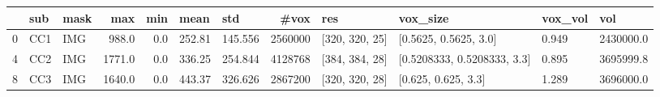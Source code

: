 \begin{tabular}{lllrrllrllll}
\toprule
{} &  sub & mask &     max &  min &    mean &      std &     \#vox &             res &                     vox\_size & vox\_vol &        vol \\
\midrule
0 &  CC1 &  IMG &   988.0 &  0.0 &  252.81 &  145.556 &  2560000 &  [320, 320, 25] &        [0.5625, 0.5625, 3.0] &   0.949 &  2430000.0 \\
4 &  CC2 &  IMG &  1771.0 &  0.0 &  336.25 &  254.844 &  4128768 &  [384, 384, 28] &  [0.5208333, 0.5208333, 3.3] &   0.895 &  3695999.8 \\
8 &  CC3 &  IMG &  1640.0 &  0.0 &  443.37 &  326.626 &  2867200 &  [320, 320, 28] &          [0.625, 0.625, 3.3] &   1.289 &  3696000.0 \\
\bottomrule
\end{tabular}
